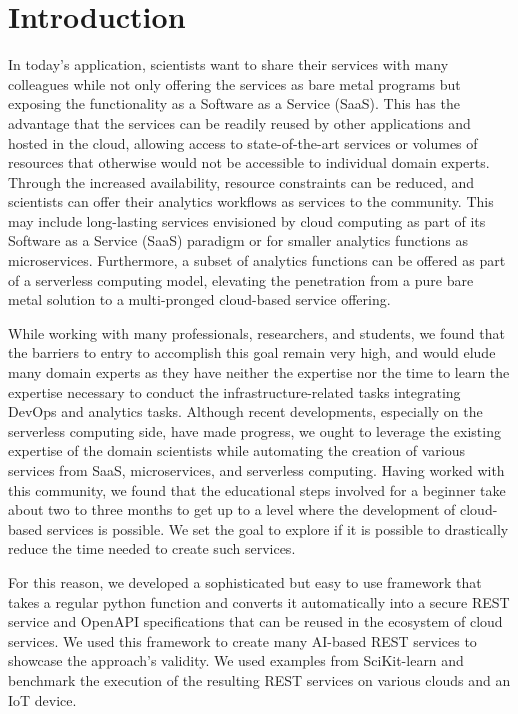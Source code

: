 
\section{Introduction}


In today's application, scientists want to share their services with many colleagues while not only offering the services as bare metal programs but exposing the functionality as a Software as a Service (SaaS). This has the advantage that the services can be readily reused by other applications and hosted in the cloud, allowing access to state-of-the-art services or volumes of resources that otherwise would not be accessible to individual domain experts. Through the increased availability, resource constraints can be reduced, and scientists can offer their analytics workflows as services to the community. This may include long-lasting services envisioned by cloud computing as part of its Software as a Service (SaaS) paradigm or for smaller analytics functions as microservices. Furthermore, a subset of analytics functions can be offered as part of a serverless computing model, elevating the penetration from a pure bare metal solution to a multi-pronged cloud-based service offering.

While working with many professionals, researchers, and students, we found that the barriers to entry to accomplish this goal remain very high, and would elude many domain experts as they have neither the expertise nor the time to learn the expertise necessary to conduct the infrastructure-related tasks integrating DevOps and analytics tasks. Although recent developments, especially on the serverless computing side, have made progress, we ought to leverage the existing expertise of the domain scientists while automating the creation of various services from SaaS, microservices, and serverless computing.
Having worked with this community, we found that the educational steps involved for a beginner take about two to three months to get up to a level where the development of cloud-based services is possible. We set the goal to explore if it is possible to drastically reduce the time needed to create such services.

For this reason, we developed a sophisticated but easy to use framework that takes a regular python function and converts it automatically into a secure REST service and OpenAPI specifications \cite{openapi} that can be reused in the ecosystem of cloud services. We used this framework to create many AI-based REST services to showcase the approach's validity. We used examples from SciKit-learn \cite{scikit-learn} and benchmark the execution of the resulting REST services on various clouds and an IoT device. 

